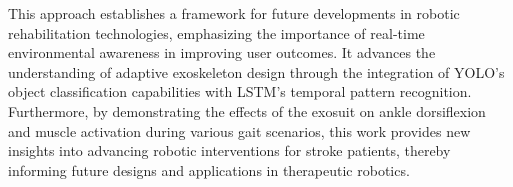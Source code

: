 \documentclass[actuators,article,accept,pdftex,moreauthors]{Definitions/mdpi}
\begin{document}
{This approach establishes a framework for future developments in robotic rehabilitation technologies, emphasizing the importance of real-time environmental awareness in improving user outcomes. It advances the understanding of adaptive exoskeleton design through the integration of YOLO’s object classification capabilities with LSTM’s temporal pattern recognition. Furthermore, by demonstrating the effects of the exosuit on ankle dorsiflexion and muscle activation during various gait scenarios, this work provides new insights into advancing robotic interventions for stroke patients, thereby informing future designs and applications in therapeutic robotics.}




\vspace{6pt} 



\end{document}
